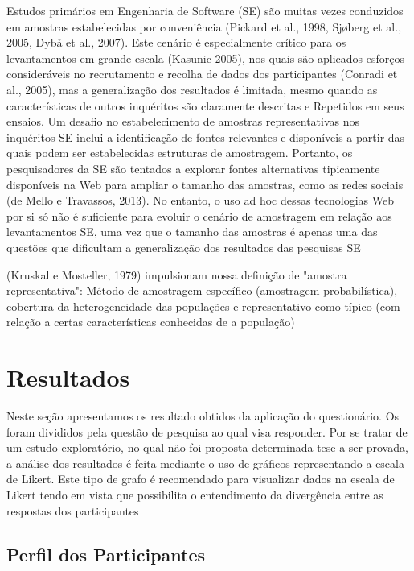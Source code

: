 Estudos primários em Engenharia de Software (SE) são muitas vezes conduzidos em
amostras estabelecidas por conveniência (Pickard et al., 1998, Sjøberg et al.,
2005, Dybå et al., 2007). Este cenário é especialmente crítico para os
levantamentos em grande escala (Kasunic 2005), nos quais são aplicados esforços
consideráveis no recrutamento e recolha de dados dos participantes (Conradi et
al., 2005), mas a generalização dos resultados é limitada, mesmo quando as
características de outros inquéritos são claramente descritas e Repetidos em
seus ensaios.
Um desafio no estabelecimento de amostras representativas nos inquéritos SE
inclui a identificação de fontes relevantes e disponíveis a partir das quais
podem ser estabelecidas estruturas de amostragem. Portanto, os pesquisadores da
SE são tentados a explorar fontes alternativas tipicamente disponíveis na Web
para ampliar o tamanho das amostras, como as redes sociais (de Mello e
Travassos, 2013). No entanto, o uso ad hoc dessas tecnologias Web por si só não
é suficiente para evoluir o cenário de amostragem em relação aos levantamentos
SE, uma vez que o tamanho das amostras é apenas uma das questões que dificultam
a generalização dos resultados das pesquisas SE

(Kruskal e Mosteller, 1979) impulsionam nossa definição de "amostra
representativa": Método de amostragem específico (amostragem probabilística),
cobertura da heterogeneidade das populações e representativo como típico (com
relação a certas características conhecidas de a população)

\section{Resultados}
\label{sec:analise_dados}

Neste seção apresentamos os resultado obtidos da aplicação do questionário. Os
foram divididos pela questão de pesquisa ao qual visa responder. Por se tratar
de um estudo exploratório, no qual não foi proposta determinada tese a ser
provada, a análise dos resultados é feita mediante o uso de gráficos
representando a escala de Likert. Este tipo de grafo é recomendado para
visualizar dados na escala de Likert tendo em vista que possibilita o
entendimento da divergência entre as respostas dos
participantes~\cite{robbins2011plotting}

\subsection{Perfil dos Participantes}
\label{sub:perfil_dos_participantes}


